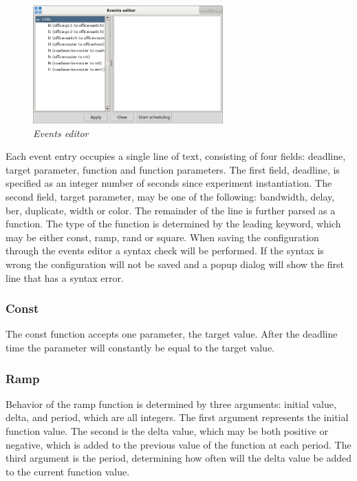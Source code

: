 \begin{figure}[H]
	\centering
	\vspace{10pt}
	\includegraphics[width=0.65\textwidth]{./images/event_editor.png}
	\caption{\emph{Events editor}}
	\label{fig:event_editor}
\end{figure}

Each event entry occupies a single line of text, consisting of four fields:
deadline, target parameter, function and function parameters. The first field,
deadline, is specified as an integer number of seconds since experiment
instantiation. The second field, target parameter, may be one of the following:
bandwidth, delay, ber, duplicate, width or color. The remainder of the line is
further parsed as a function. The type of the function is determined by the
leading keyword, which may be either const, ramp, rand or square. When saving
the configuration through the events editor a syntax check will be performed.
If the syntax is wrong the configuration will not be saved and a popup dialog
will show the first line that has a syntax error.

\subsubsection{Const}
The const function accepts one parameter, the target value. After the deadline
time the parameter will constantly be equal to the target value.

\subsubsection{Ramp}
Behavior of the ramp function is determined by three arguments: initial value,
delta, and period, which are all integers. The first argument represents the
initial function value. The second is the delta value, which may be both
positive or negative, which is added to the previous value of the function at
each period. The third argument is the period, determining how often will the
delta value be added to the current function value.

